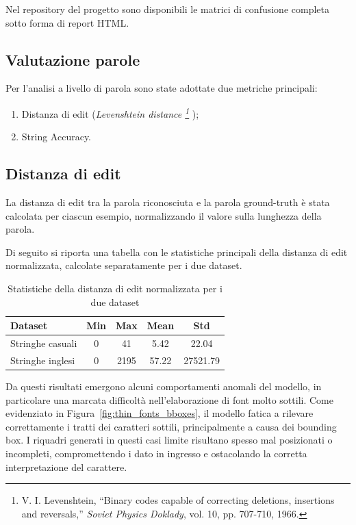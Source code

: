 Nel repository del progetto sono disponibili le matrici di confusione completa sotto forma di report HTML.

\subsection{Valutazione parole}
\label{sec:valutazione-stringhe}

Per l'analisi a livello di parola sono state adottate due metriche principali:
\begin{enumerate}
    \item Distanza di edit (\emph{Levenshtein distance \footnote{V. I. Levenshtein, “Binary codes capable of correcting deletions, insertions and reversals,” \textit{Soviet Physics Doklady}, vol. 10, pp. 707-710, 1966.} });
    \item String Accuracy.
\end{enumerate}

\subsection{Distanza di edit}
La distanza di edit tra la parola riconosciuta e la parola ground-truth è stata calcolata per ciascun esempio, normalizzando il valore sulla lunghezza della parola.

Di seguito si riporta una tabella con le statistiche principali della distanza di edit normalizzata, calcolate separatamente per i due dataset.

\begin{table}[htbp]
    \centering
    \begin{tabular}{lcccc}
        \toprule
        Dataset                 & Min   & Max   & Mean  & Std   \\
        \midrule
        Stringhe casuali       & 0  & 41 & 5.42  & 22.04 \\
        Stringhe inglesi & 0  & 2195 & 57.22  & 27521.79 \\
        \bottomrule
    \end{tabular}
    \caption{Statistiche della distanza di edit normalizzata per i due dataset}
    \label{tab:edit_distance_stats}
\end{table}

Da questi risultati emergono alcuni comportamenti anomali del modello, in particolare una marcata difficoltà nell'elaborazione di font molto sottili. Come evidenziato in Figura~\ref{fig:thin_fonts_bboxes}, il modello fatica a rilevare correttamente i tratti dei caratteri sottili, principalmente a causa dei bounding box. I riquadri generati in questi casi limite risultano spesso mal posizionati o incompleti, compromettendo i dato in ingresso e ostacolando la corretta interpretazione del carattere.

